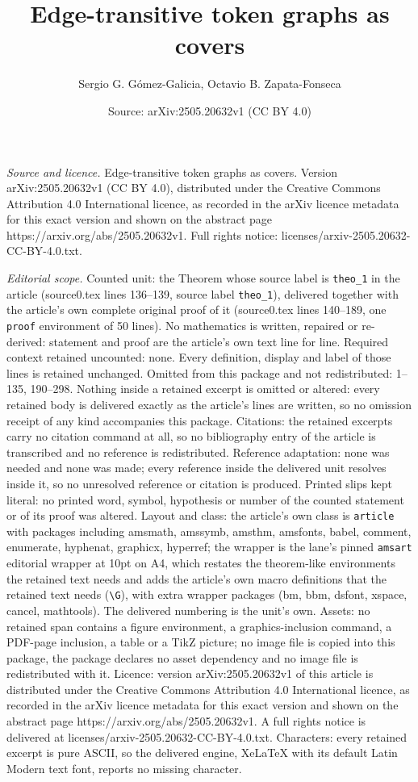 \documentclass[10pt,a4paper]{amsart}
\title[Edge-transitive token graphs as covers]{Edge-transitive token graphs as covers}
\author{Sergio G. G\'omez-Galicia, Octavio B. Zapata-Fonseca}
\date{Source: arXiv:2505.20632v1 (CC BY 4.0)}
\begin{document}
\maketitle

\noindent\emph{Source and licence.} Edge-transitive token graphs as covers. Version arXiv:2505.20632v1 (CC BY 4.0), distributed under the Creative Commons Attribution 4.0 International licence, as recorded in the arXiv licence metadata for this exact version and shown on the abstract page https://arxiv.org/abs/2505.20632v1. Full rights notice: licenses/arxiv-2505.20632-CC-BY-4.0.txt.\par\smallskip

\noindent\textit{Editorial scope.} Counted unit: the Theorem whose source label is \texttt{theo\_1} in the article (source0.tex lines 136--139, source label \texttt{theo\_1}), delivered together with the article's own complete original proof of it (source0.tex lines 140--189, one \texttt{proof} environment of 50 lines). No mathematics is written, repaired or re-derived: statement and proof are the article's own text line for line. Required context retained uncounted: none. Every definition, display and label of those lines is retained unchanged. Omitted from this package and not redistributed: 1--135, 190--298. Nothing inside a retained excerpt is omitted or altered: every retained body is delivered exactly as the article's lines are written, so no omission receipt of any kind accompanies this package. Citations: the retained excerpts carry no citation command at all, so no bibliography entry of the article is transcribed and no reference is redistributed. Reference adaptation: none was needed and none was made; every reference inside the delivered unit resolves inside it, so no unresolved reference or citation is produced. Printed slips kept literal: no printed word, symbol, hypothesis or number of the counted statement or of its proof was altered. Layout and class: the article's own class is \texttt{article} with packages including amsmath, amssymb, amsthm, amsfonts, babel, comment, enumerate, hyphenat, graphicx, hyperref; the wrapper is the lane's pinned \texttt{amsart} editorial wrapper at 10pt on A4, which restates the theorem-like environments the retained text needs and adds the article's own macro definitions that the retained text needs (\texttt{\textbackslash G}), with extra wrapper packages (bm, bbm, dsfont, xspace, cancel, mathtools). The delivered numbering is the unit's own. Assets: no retained span contains a figure environment, a graphics-inclusion command, a PDF-page inclusion, a table or a TikZ picture; no image file is copied into this package, the package declares no asset dependency and no image file is redistributed with it. Licence: version arXiv:2505.20632v1 of this article is distributed under the Creative Commons Attribution 4.0 International licence, as recorded in the arXiv licence metadata for this exact version and shown on the abstract page https://arxiv.org/abs/2505.20632v1. A full rights notice is delivered at licenses/arxiv-2505.20632-CC-BY-4.0.txt. Characters: every retained excerpt is pure ASCII, so the delivered engine, XeLaTeX with its default Latin Modern text font, reports no missing character.
\end{document}

